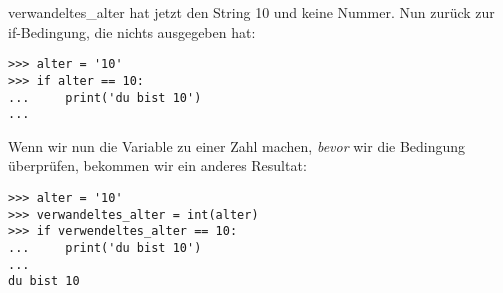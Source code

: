 \noindent
verwandeltes\_alter hat jetzt den String 10 und keine Nummer. Nun zurück zur if-Bedingung, die nichts ausgegeben hat:

\begin{listing}
\begin{verbatim}
>>> alter = '10'
>>> if alter == 10:
...     print('du bist 10')
...
\end{verbatim}
\end{listing}

\noindent
Wenn wir nun die Variable zu einer Zahl machen, \emph{bevor} wir die Bedingung überprüfen, bekommen wir ein anderes Resultat:

\begin{listing}
\begin{verbatim}
>>> alter = '10'
>>> verwandeltes_alter = int(alter)
>>> if verwendeltes_alter == 10:
...     print('du bist 10')
...
du bist 10
\end{verbatim}
\end{listing}

\newpage
